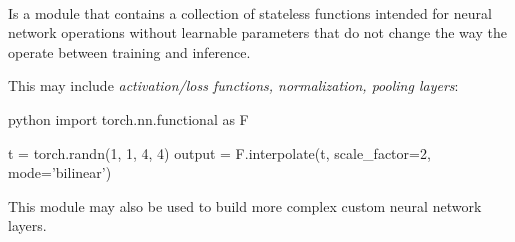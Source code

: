 \begin{defnbox}\nospacing
    \begin{defn}\label{defn:torch_functional}\leavevmode\\
        Is a module that contains a collection of stateless functions intended for neural network operations without learnable parameters that do not change the way the operate between training and inference.

        This may include \textit{activation/loss functions, normalization, pooling layers}:
        \begin{mintlinebox}{python}
            import torch.nn.functional as F

            t = torch.randn(1, 1, 4, 4)
            output = F.interpolate(t, scale_factor=2, mode='bilinear')
        \end{mintlinebox}
    \end{defn}
\end{defnbox}
\begin{notebox}[Note]\nospacing
   This module may also be used to build more complex custom neural network layers.
\end{notebox}
